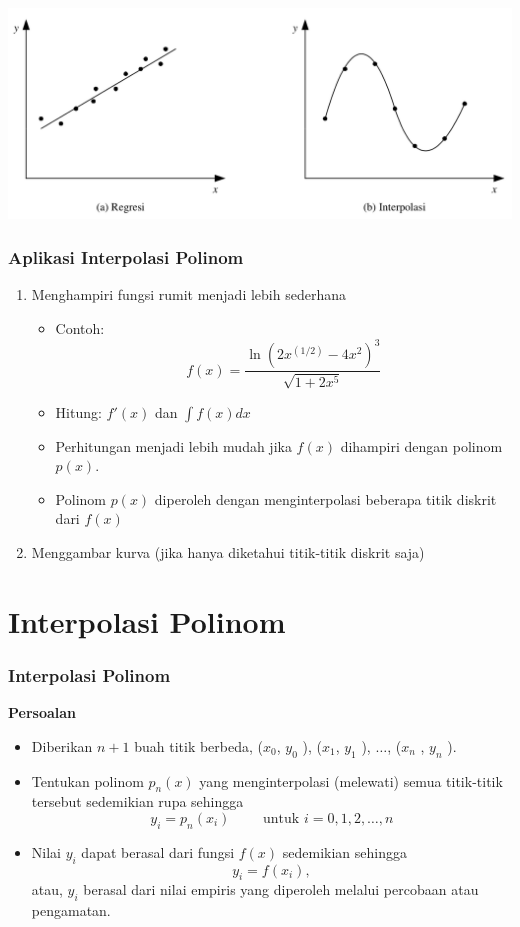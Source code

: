 \documentclass[pdflatex,compress,mathserif]{beamer}
\begin{document}
\begin{frame}
	\begin{center}
		\includegraphics[width=\linewidth]{img/img02}
	\end{center}
\end{frame}

\begin{frame}
	\frametitle{Aplikasi Interpolasi Polinom}
	\begin{enumerate}
		\item Menghampiri fungsi rumit menjadi lebih sederhana
		\begin{itemize}
			\item Contoh: \[ f(x) = \frac{\ln(2x^{(1/2)}-4x^2)^3}{\sqrt{1+2x^5}} \]
			\item[] Hitung: $ f'(x) $ dan $\int f(x) dx$
			\item Perhitungan menjadi lebih mudah jika $ f(x) $ dihampiri dengan polinom $ p(x) $.
			\item Polinom $ p(x) $ diperoleh dengan menginterpolasi beberapa titik diskrit dari $ f(x) $
		\end{itemize}
		\item Menggambar kurva (jika hanya diketahui titik-titik diskrit saja)
	\end{enumerate}
\end{frame}

\section{Interpolasi Polinom}

\begin{frame}
	\frametitle{Interpolasi Polinom}
	\textbf{Persoalan}
	\begin{itemize}
		\item Diberikan $ n+1 $ buah titik berbeda, ($ x_0 $, $ y_0 $ ), ($ x_1 $, $ y_1 $ ), $\dots$, ($ x_n $ , $ y_n $ ).
		\item Tentukan polinom $ p_n(x) $ yang menginterpolasi (melewati) semua titik-titik tersebut sedemikian rupa sehingga
		\[ y_i = p_n(x_i)\qquad \text{ untuk } i = 0,1,2,\dots,n \]
		\item Nilai $ y_i $ dapat berasal dari fungsi $ f(x) $ sedemikian sehingga \[ y_i = f(x_i), \] atau, $ y_i $ berasal dari nilai empiris yang diperoleh melalui percobaan atau pengamatan.
	\end{itemize}
\end{frame}
\end{document}
